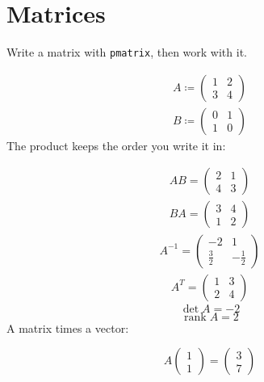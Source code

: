 \documentclass[11pt,a4paper]{article}
\theoremstyle{plain}
\theoremstyle{definition}
\theoremstyle{remark}
\begin{document}
\section*{Matrices}

Write a matrix with \texttt{pmatrix}, then work with it.

\begin{align*}
  A \coloneqq  \begin{pmatrix} 1 & 2 \\ 3 & 4 \end{pmatrix}
\end{align*}
\begin{align*}
  B \coloneqq  \begin{pmatrix} 0 & 1 \\ 1 & 0 \end{pmatrix}
\end{align*}
The product keeps the order you write it in:

\begin{align*}
  A B = \begin{pmatrix} 2 & 1 \\ 4 & 3 \end{pmatrix}
\end{align*}
\begin{align*}
  B A = \begin{pmatrix} 3 & 4 \\ 1 & 2 \end{pmatrix}
\end{align*}
\begin{align*}
  A^{-1} = \begin{pmatrix} -2 & 1 \\ \frac{3}{2} & -\frac{1}{2} \end{pmatrix}
\end{align*}
\begin{align*}
  A^T = \begin{pmatrix} 1 & 3 \\ 2 & 4 \end{pmatrix}
\end{align*}
\begin{equation*}
  \det A = -2
\end{equation*}
\begin{equation*}
  \operatorname{rank} A = 2
\end{equation*}
A matrix times a vector:

\begin{equation*}
  A \begin{pmatrix} 1 \\ 1 \end{pmatrix} = \begin{pmatrix} 3 \\ 7 \end{pmatrix}
\end{equation*}
\end{document}

